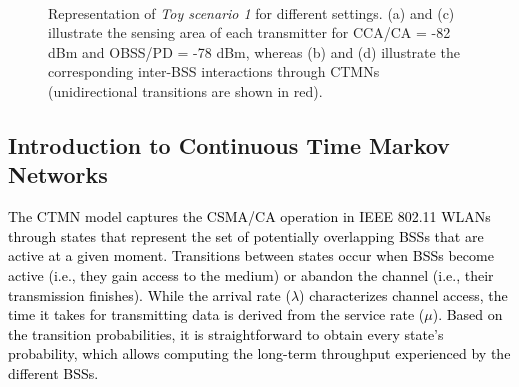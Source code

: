 \documentclass{ieeeaccess}
\begin{document}
\begin{figure}[h!]
	\centering
	\hspace{1cm}
	\\
	\hspace{1cm}
	\caption{Representation of \emph{Toy scenario 1} for different settings. (a) and (c) illustrate the sensing area of each transmitter for CCA/CA = -82 dBm and OBSS/PD = -78 dBm, whereas (b) and (d) illustrate the corresponding inter-BSS interactions through CTMNs (unidirectional transitions are shown in red).}
	\label{fig:toy_scenario_1b}
\end{figure}

\subsection{Introduction to Continuous Time Markov Networks}
\textcolor{black}{The CTMN model captures the CSMA/CA operation in IEEE 802.11 WLANs through states that represent the set of potentially overlapping BSSs that are active at a given moment. Transitions between states occur when BSSs become active (i.e., they gain access to the medium) or abandon the channel (i.e., their transmission finishes). While the arrival rate ($\lambda$) characterizes channel access, the time it takes for transmitting data is derived from the service rate ($\mu$). Based on the transition probabilities, it is straightforward to obtain every state's probability, which allows computing the long-term throughput experienced by the different BSSs.}
\end{document}
